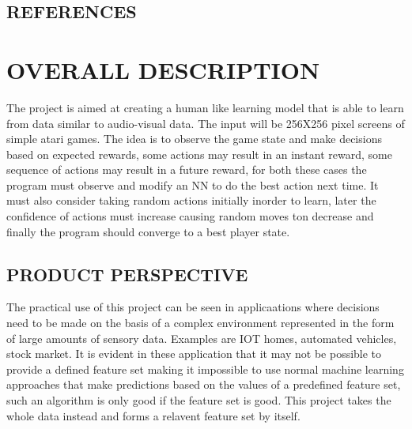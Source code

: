 \documentclass[twoside,letterpaper]{article}
\begin{document}
\subsection[REFERENCES]{\rmfamily\bfseries\color{black}
REFERENCES}
\nocite{*} 
{\color{black}


\clearpage\section[OVERALL
DESCRIPTION]{\rmfamily\bfseries\color{black}
OVERALL DESCRIPTION}

{\color{black}
The project is aimed at creating a human like learning model that is able to learn from data similar to audio-visual data. The input will be 256X256 pixel screens of simple atari games. The idea is to observe the game state and make decisions based on expected rewards, some actions may result in an instant reward, some sequence of actions may result in a future reward, for both these cases the program must observe and modify an NN to do the best action next time. It must also consider taking random actions initially inorder to learn, later the confidence of actions must increase causing random moves ton decrease and finally the program should converge to a best player state.}
\subsection[PRODUCT
PERSPECTIVE]{\rmfamily\bfseries\color{black}
PRODUCT PERSPECTIVE}


{\color{black}
The practical use of this project can be seen in applicaations where decisions need to be made on the basis of a complex environment represented in the form of large amounts of sensory data. Examples are IOT homes, automated vehicles, stock market. It is evident in these application that it may not be possible to provide a defined feature set making it impossible to use normal machine learning approaches that make predictions based on the values of a predefined feature set, such an algorithm is only good if the feature set is good. This project takes the whole data instead and forms a relavent feature set by itself.}

}
\end{document}
